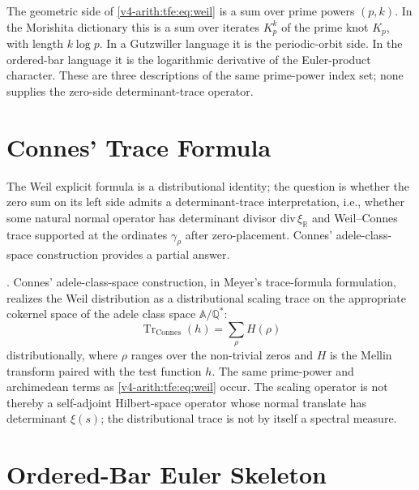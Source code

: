 \begin{remark}
\label{v4-arith:tfe:rem:weil-sketch}
The geometric side of \eqref{v4-arith:tfe:eq:weil} is a sum over
prime powers \((p,k)\). In the Morishita dictionary this is a sum
over iterates \(K_p^k\) of the prime knot \(K_p\), with length
\(k\log p\). In a Gutzwiller language it is the periodic-orbit side.
In the ordered-bar language it is the logarithmic derivative of the
Euler-product character. These are three descriptions of the same
prime-power index set; none supplies the zero-side determinant-trace
operator.
\end{remark}

\section{Connes' Trace Formula}
\label{v4-arith:tfe:connes}

The Weil explicit formula is a distributional identity; the question
is whether the zero sum on its left side admits a determinant-trace
interpretation, i.e., whether some natural normal operator has
determinant divisor \(\mathrm{div}\,\xi_{\mathbb R}\) and
Weil--Connes trace supported at the ordinates \(\gamma_\rho\) after
zero-placement. Connes' adele-class-space construction provides a
partial answer.

\begin{theorem}
\label{v4-arith:tfe:thm:connes-meyer}
\ClaimStatusProvedElsewhere. Connes' adele-class-space construction,
in Meyer's trace-formula formulation, realizes the Weil distribution
as a distributional scaling trace on the appropriate cokernel space
of the adele class space \(\mathbb{A}/\mathbb{Q}^*\):
\begin{equation}
\label{v4-arith:tfe:eq:connes-trace}
\operatorname{Tr}_{\mathrm{Connes}}(h)
=
\sum_\rho H(\rho)
\end{equation}
distributionally, where \(\rho\) ranges over the non-trivial zeros and
\(H\) is the Mellin transform paired with the test function \(h\). The
same prime-power and archimedean terms as \eqref{v4-arith:tfe:eq:weil}
occur. The scaling operator is not thereby a self-adjoint Hilbert-space
operator whose normal translate has determinant \(\xi(s)\); the
distributional trace is not by itself a spectral measure.
\end{theorem}

\section{Ordered-Bar Euler Skeleton}
\label{v4-arith:tfe:3d-acs}

